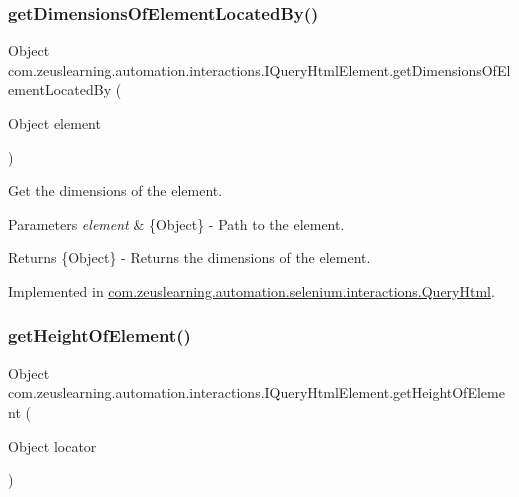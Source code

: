 \subsubsection{\texorpdfstring{get\+Dimensions\+Of\+Element\+Located\+By()}{getDimensionsOfElementLocatedBy()}}
{\footnotesize\ttfamily Object com.\+zeuslearning.\+automation.\+interactions.\+I\+Query\+Html\+Element.\+get\+Dimensions\+Of\+Element\+Located\+By (\begin{DoxyParamCaption}\item[{Object}]{element }\end{DoxyParamCaption})}

Get the dimensions of the element.


\begin{DoxyParams}{Parameters}
{\em element} & \{Object\} -\/ Path to the element. \\
\hline
\end{DoxyParams}
\begin{DoxyReturn}{Returns}
\{Object\} -\/ Returns the dimensions of the element. 
\end{DoxyReturn}


Implemented in \hyperlink{classcom_1_1zeuslearning_1_1automation_1_1selenium_1_1interactions_1_1QueryHtml_a57c813b972103a0a8160276012d202b2}{com.\+zeuslearning.\+automation.\+selenium.\+interactions.\+Query\+Html}.

\hypertarget{interfacecom_1_1zeuslearning_1_1automation_1_1interactions_1_1IQueryHtmlElement_a26efb264ee85d373a3276484aafad86e}{}\label{interfacecom_1_1zeuslearning_1_1automation_1_1interactions_1_1IQueryHtmlElement_a26efb264ee85d373a3276484aafad86e} 
\subsubsection{\texorpdfstring{get\+Height\+Of\+Element()}{getHeightOfElement()}}
{\footnotesize\ttfamily Object com.\+zeuslearning.\+automation.\+interactions.\+I\+Query\+Html\+Element.\+get\+Height\+Of\+Element (\begin{DoxyParamCaption}\item[{Object}]{locator }\end{DoxyParamCaption})}


